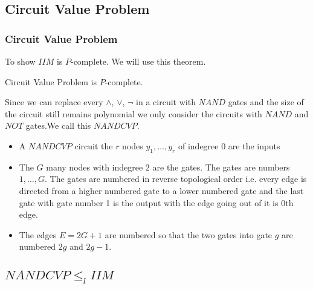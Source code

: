 \documentclass[article,8pt]{beamer}%
\begin{document}
\subsection{Circuit Value Problem}


\begin{frame}
\frametitle{Circuit Value Problem}
To show $IIM$ is $P$-complete. We will use this theorem.
\begin{theorem}
	Circuit Value Problem is $P$-complete.
\end{theorem}
Since we can replace every $\wedge$, $\vee$, $\neg$ in a circuit with $NAND$ gates and the size of the circuit still remains polynomial we only consider the circuits with $NAND$ and $NOT$ gates.We call this $NANDCVP$.



\begin{itemize}
	\item A $NANDCVP$ circuit the $r$ nodes $y_1,\dots, y_r$ of indegree 0 are the inputs 
	\item The $G$ many nodes  with indegree 2 are the gates. The gates are numbers $1,\dots, G$. The gates are numbered in reverse topological order i.e. every edge is directed from a higher numbered gate to a lower numbered gate and the last gate with gate number 1 is the output with the edge going out of it is 0th edge.  
	\item The edges $E=2G+1$ are numbered so that the two gates into gate $g$ are numbered $2g $ and $2g-1$.
\end{itemize}
\end{frame}

\subsection{$NANDCVP\leq_l IIM$}
\end{document}
